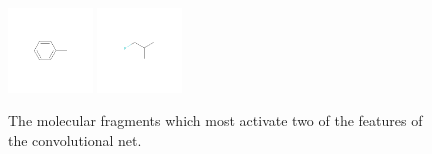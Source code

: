 \documentclass{article}
\begin{document}
\begin{figure}
\centerline{
\includegraphics[width=0.2\textwidth]{figures/convnet-features/hidden-unit-0}
\includegraphics[width=0.2\textwidth]{figures/convnet-features/hidden-unit-1}}
\caption{The molecular fragments which most activate two of the features of the convolutional net.}
\label{placeholder}
\end{figure}
\end{document}
